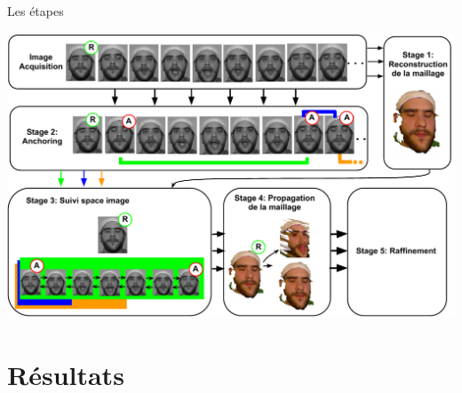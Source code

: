 \documentclass[compress,pdf,11pt,xcolor=dvipsnames]{beamer}
\begin{document}
\begin{frame}{Les étapes}
  \begin{center}
    \includegraphics[width=\textwidth]{img/projDiagram}
  \end{center}
\end{frame}


\section{Résultats}
\end{document}
